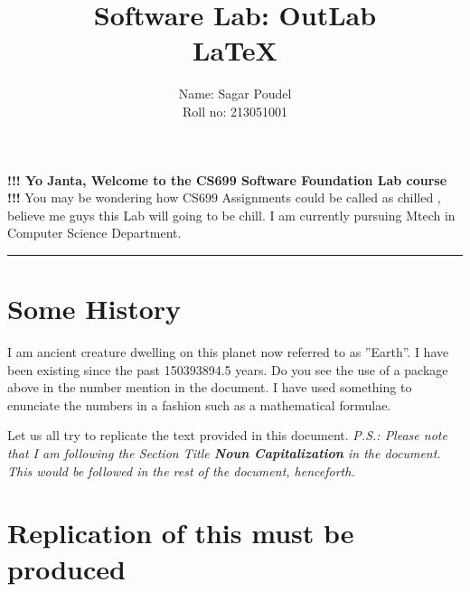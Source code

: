 \documentclass[12pt]{article}
\title{ \textbf {Software Lab: OutLab\\ \LaTeX{}}}
\author {
    Name: Sagar Poudel\\
    Roll no: 213051001
}
\begin{document}
\begin{titlingpage}
    \maketitle
\end{titlingpage}
{
\hypersetup{linkcolor=black}
\tableofcontents
}
\newpage
\begin{flushleft}
    \textbf{!!! Yo Janta, Welcome to the CS699 Software Foundation Lab course !!!}\newline
    You may be wondering how CS699 Assignments could be called as chilled , believe me guys this Lab will going to be chill. I am currently pursuing Mtech in Computer Science Department.
\end{flushleft}
\vspace{4pt}
\hrule
\vspace{4pt}
\section{Some History}

I am ancient creature dwelling on this planet now referred to as ”Earth”. I have been
existing since the past 150393894.5 years. Do you see the use of a package above in the
number mention in the document. I have used something to enunciate the numbers in
a fashion such as a mathematical formulae.

Let us all try to replicate the text provided in this document.\newline
\indent \emph{P.S.: Please note that I am following the Section Title \textbf{Noun Capitalization} in
    the document. This would be followed in the rest of the document, henceforth.}


\section{Replication of this must be produced}
\end{document}
